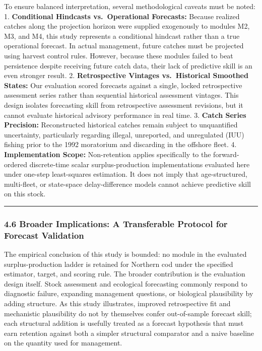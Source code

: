 \documentclass[11pt]{article}
\begin{document}
To ensure balanced interpretation, several methodological caveats must
be noted: 1. \textbf{Conditional Hindcasts vs.~Operational Forecasts:}
Because realized catches along the projection horizon were supplied
exogenously to modules M2, M3, and M4, this study represents a
conditional hindcast rather than a true operational forecast. In actual
management, future catches must be projected using harvest control
rules. However, because these modules failed to beat persistence despite
receiving future catch data, their lack of predictive skill is an even
stronger result. 2. \textbf{Retrospective Vintages vs.~Historical
Smoothed States:} Our evaluation scored forecasts against a single,
locked retrospective assessment series rather than sequential historical
assessment vintages. This design isolates forecasting skill from
retrospective assessment revisions, but it cannot evaluate historical
advisory performance in real time. 3. \textbf{Catch Series Precision:}
Reconstructed historical catches remain subject to unquantified
uncertainty, particularly regarding illegal, unreported, and unregulated
(IUU) fishing prior to the 1992 moratorium and discarding in the
offshore fleet. 4. \textbf{Implementation Scope:} Non-retention applies
specifically to the forward-ordered discrete-time scalar
surplus-production implementations evaluated here under one-step
least-squares estimation. It does not imply that age-structured,
multi-fleet, or state-space delay-difference models cannot achieve
predictive skill on this stock.

\begin{center}\rule{0.5\linewidth}{0.5pt}\end{center}

\subsubsection{4.6 Broader Implications: A Transferable Protocol for
Forecast
Validation}\label{broader-implications-a-transferable-protocol-for-forecast-validation}

The empirical conclusion of this study is bounded: no module in the
evaluated surplus-production ladder is retained for Northern cod under
the specified estimator, target, and scoring rule. The broader
contribution is the evaluation design itself. Stock assessment and
ecological forecasting commonly respond to diagnostic failure, expanding
management questions, or biological plausibility by adding structure. As
this study illustrates, improved retrospective fit and mechanistic
plausibility do not by themselves confer out-of-sample forecast skill;
each structural addition is usefully treated as a forecast hypothesis
that must earn retention against both a simpler structural comparator
and a naive baseline on the quantity used for management.
\end{document}

